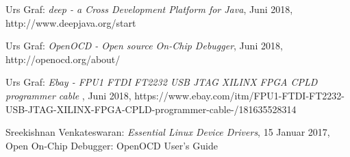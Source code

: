\begingroup
\renewcommand{\chapter}[2]{\section#1{#2}}%
\begin{thebibliography}{99}


	Urs Graf:
	\emph{deep - a Cross Development Platform for Java},
	Juni 2018, http://www.deepjava.org/start

	Urs Graf:
	\emph{OpenOCD - Open source On-Chip Debugger},
	Juni 2018, http://openocd.org/about/

	Urs Graf:
	\emph{Ebay - FPU1 FTDI FT2232 USB JTAG XILINX FPGA CPLD programmer cable },
	Juni 2018, https://www.ebay.com/itm/FPU1-FTDI-FT2232-USB-JTAG-XILINX-FPGA-CPLD-programmer-cable-/181635528314
	
	Sreekishnan Venkateswaran:
	\emph{Essential Linux Device Drivers},
	15 Januar 2017, Open On-Chip Debugger: OpenOCD User's Guide






	\end{thebibliography}
\endgroup